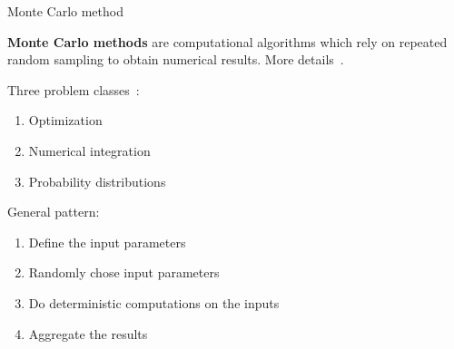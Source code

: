 \documentclass[12pt]{beamer}
\begin{document}
\begin{frame}{Monte Carlo method}

\textbf{Monte Carlo methods} are computational algorithms which rely on repeated random sampling to obtain numerical results. More details~\cite{shonkwiler2009explorations}.

\begin{block}{Three problem classes~\cite{kroese2014monte}:}
\begin{enumerate}
\item Optimization
\item Numerical integration
\item Probability distributions
\end{enumerate}
\end{block}

\begin{block}{General pattern:}
\begin{enumerate}
\item Define the input parameters
\item Randomly chose input parameters   
\item Do deterministic computations on the inputs
\item Aggregate the results
\end{enumerate}
\end{block}
\end{frame}
\end{document}
